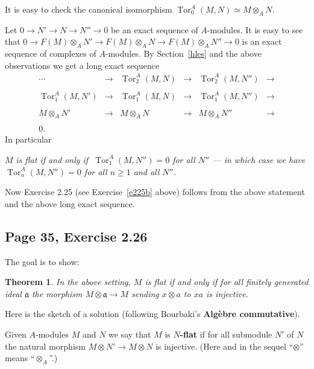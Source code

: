 \documentclass[parskip=half,fontsize=12pt]{scrartcl}%
\newcommand{\mf}{\mathfrak}
\newcommand{\aaa}{\mf a}
\newcommand{\Tor}{\operatorname{Tor}}
\newtheorem{thm}{Theorem}%
\begin{document}
It is easy to check the canonical isomorphism $\Tor^A_0(M,N)\simeq M\otimes_AN$.

Let $0\to N'\to N\to N''\to0$ be an exact sequence of $A$-modules. It is easy to see that $0\to F(M)\otimes_AN'\to F(M)\otimes_AN\to F(M)\otimes_AN''\to0$ is an exact sequence of complexes of $A$-modules. By Section~\ref{hles} and the above observations we get a long exact sequence 
$$
\begin{matrix}
\cdots&\to&\Tor^A_2(M,N)&\to&\Tor^A_2(M,N'')&\to\\ \\ 
\Tor^A_1(M,N')&\to&\Tor^A_1(M,N)&\to&\Tor^A_1(M,N'')&\to\\ \\ 
M\otimes_AN'&\to&M\otimes_AN&\to&M\otimes_AN''&\to\\ \\ 
0.
\end{matrix}
$$ 
In particular 

$M$ \emph{is flat if and only if $\ \Tor^A_1(M,N'')=0$ for all $N''$ --- in which case we have $\Tor^A_n(M,N'')=0$ for all $n\ge1$ and all $N''$.}

Now Exercise 2.25 (see Exercise~\ref{e225b} above) follows from the above statement and the above long exact sequence.

\subsection{Page 35, Exercise 2.26}\label{35}%

The goal is to show: 



\begin{thm}\label{flatcrit}
In the above setting, $M$ is flat if and only if for all finitely generated ideal $\aaa$ the morphism $M\otimes\aaa\to M$ sending $x\otimes a$ to $xa$ is injective.
\end{thm}

Here is the sketch of a solution (following Bourbaki's \textbf{Algèbre commutative}).

Given $A$-modules $M$ and $N$ we say that $M$ is $N$\textbf{-flat} if for all submodule $N'$ of $N$ the natural morphism $M\otimes N'\to M\otimes N$ is injective. (Here and in the sequel ``$\otimes$'' means ``$\otimes_A$''.) 
\end{document}
